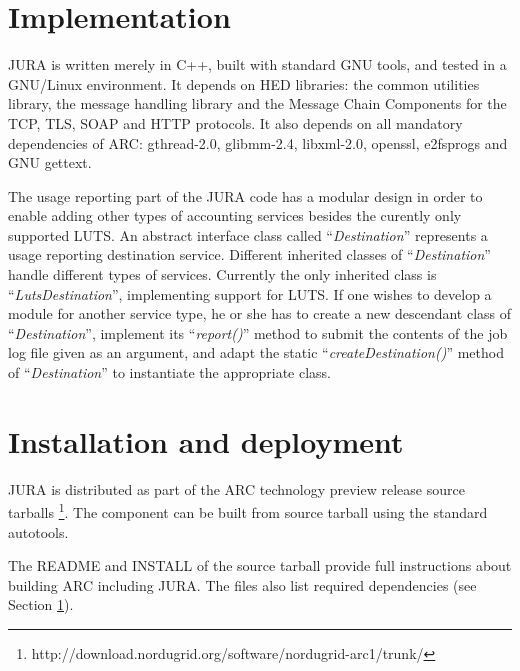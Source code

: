 \documentclass{article}                            %
\begin{document}




\section{Implementation}
\label{implement}
JURA is written merely in C++, built with standard GNU tools, and
tested in a GNU/Linux environment. It depends on HED libraries: the
common utilities library, the message handling library and the Message
Chain Components for the TCP, TLS, SOAP and HTTP protocols. It also
depends on all mandatory dependencies of ARC: gthread-2.0, glibmm-2.4,
libxml-2.0, openssl, e2fsprogs and GNU gettext.


The usage reporting part of the JURA code has a modular design in
order to enable adding other types of accounting services besides the
curently only supported LUTS. An abstract interface class called
``\textit{Destination}'' represents a usage reporting destination
service. Different inherited classes of ``\textit{Destination}''
handle different types of services. Currently the only inherited class
is ``\textit{LutsDestination}'', implementing support for LUTS. If one
wishes to develop a module for another service type, he or she has to
create a new descendant class of ``\textit{Destination}'', implement
its ``\textit{report()}'' method to submit the contents of the job log
file given as an argument, and adapt the static
``\textit{createDestination()}'' method of ``\textit{Destination}'' to
instantiate the appropriate class.

\section{Installation and deployment}

JURA is distributed as part of the ARC technology preview release
source tarballs \footnote{http://download.nordugrid.org/software/nordugrid-arc1/trunk/}.
The component can be built from source tarball using the standard autotools.

The README and INSTALL of the source tarball provide full
instructions about building ARC including JURA. The files also list
required dependencies (see Section \ref{implement}).
\end{document}
